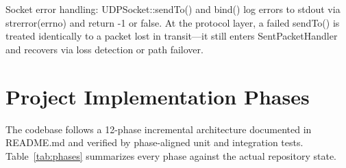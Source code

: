 \documentclass[10pt,a4paper]{article}
\newcommand{\codeul}{\textunderscore\hspace{0pt}}
\DeclareRobustCommand{\code}[1]{{\ttfamily\let\_\codeul #1}}
\begin{document}
Socket error handling: \code{UDPSocket::sendTo()} and \code{bind()} log errors to \code{stdout} via \code{strerror(errno)} and return \code{-1} or \code{false}. At the protocol layer, a failed \code{sendTo()} is treated identically to a packet lost in transit—it still enters \code{SentPacketHandler} and recovers via loss detection or path failover.

\section{Project Implementation Phases}

The codebase follows a 12-phase incremental architecture documented in \code{README.md} and verified by phase-aligned unit and integration tests. Table~\ref{tab:phases} summarizes every phase against the actual repository state.
\end{document}

